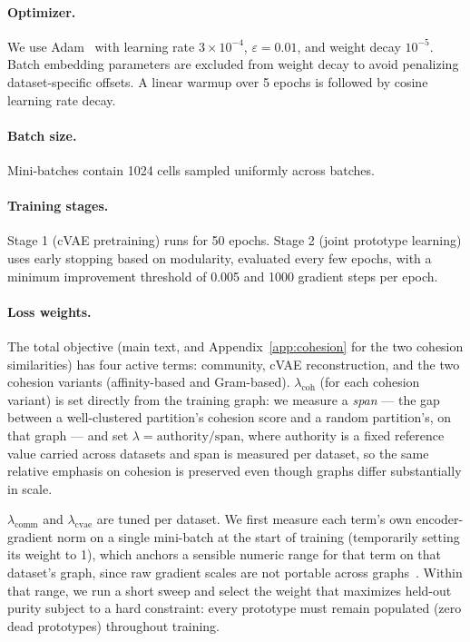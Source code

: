 \paragraph{Optimizer.}
We use Adam~\citep{adam} with learning rate $3 \times 10^{-4}$, $\varepsilon = 0.01$, and weight decay $10^{-5}$.
Batch embedding parameters are excluded from weight decay to avoid penalizing dataset-specific offsets.
A linear warmup over 5 epochs is followed by cosine learning rate decay.

\paragraph{Batch size.}
Mini-batches contain 1024 cells sampled uniformly across batches.

\paragraph{Training stages.}
Stage 1 (cVAE pretraining) runs for 50 epochs.
Stage 2 (joint prototype learning) uses early stopping based on modularity, evaluated every few epochs, with a minimum improvement threshold of 0.005 and 1000 gradient steps per epoch.

\paragraph{Loss weights.}
The total objective (main text, and Appendix~\ref{app:cohesion} for the two cohesion similarities) has four active terms: community, cVAE reconstruction, and the two cohesion variants (affinity-based and Gram-based). $\lambda_{\text{coh}}$ (for each cohesion variant) is set directly from the training graph: we measure a \emph{span} --- the gap between a well-clustered partition's cohesion score and a random partition's, on that graph --- and set $\lambda = \text{authority}/\text{span}$, where authority is a fixed reference value carried across datasets and span is measured per dataset, so the same relative emphasis on cohesion is preserved even though graphs differ substantially in scale.

$\lambda_{\text{comm}}$ and $\lambda_{\text{cvae}}$ are tuned per dataset. We first measure each term's own encoder-gradient norm on a single mini-batch at the start of training (temporarily setting its weight to 1), which anchors a sensible numeric range for that term on that dataset's graph, since raw gradient scales are not portable across graphs~\citep{chen2018gradnorm}. Within that range, we run a short sweep and select the weight that maximizes held-out purity subject to a hard constraint: every prototype must remain populated (zero dead prototypes) throughout training.

